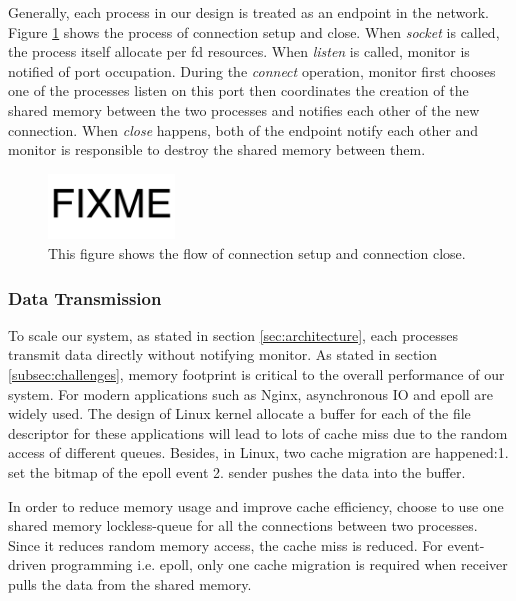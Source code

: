 Generally, each process in our design is treated as an endpoint in the network. Figure \ref{fig:conn-setup-close} shows the process of connection setup and close. When \textit{socket} is called, the process itself allocate per fd resources. When \textit{listen} is called, monitor is notified of port occupation. During the \textit{connect} operation, monitor first chooses one of the processes listen on this port then coordinates the creation of the shared memory between the two processes and notifies each other of the new connection. When \textit{close} happens, both of the endpoint notify each other and monitor is responsible to destroy the shared memory between them. 

\begin{figure}[t]
	\centering
	\includegraphics[width=0.3\textwidth]{images/fixme}
	\caption{This figure shows the flow of connection setup and connection close.}
	\label{fig:conn-setup-close}
\end{figure}


\subsubsection{Data Transmission}
\label{subsubsec:data_trans}

To scale our system, as stated in section \ref{sec:architecture}, each processes transmit data directly without notifying monitor. As stated in section \ref{subsec:challenges}, memory footprint is critical to the overall performance of our system. For modern applications such as Nginx, asynchronous IO and epoll are widely used. The design of Linux kernel allocate a buffer for each of the file descriptor for these applications will lead to lots of cache miss due to the random access of different queues. Besides, in Linux, two cache migration are happened:1. set the bitmap of the epoll event 2. sender pushes the data into the buffer.

In order to reduce memory usage and improve cache efficiency, \libipc choose to use one shared memory lockless-queue for all the connections between two processes. Since it reduces random memory access, the cache miss is reduced. For event-driven programming i.e. epoll, only one cache migration is required when receiver pulls the data from the shared memory.

